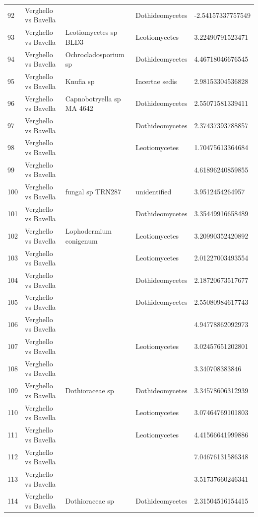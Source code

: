\documentclass[12pt]{article}\usepackage[]{graphicx}\usepackage[]{color}
\numberwithin{figure}{section}
\begin{document}
\begin{table}[ht]
\begin{tabular}{lllll}
  92 & Verghello vs Bavella &  & Dothideomycetes & -2.54157337757549 \\ 
  93 & Verghello vs Bavella & Leotiomycetes sp BLD3 & Leotiomycetes & 3.22490791523471 \\ 
  94 & Verghello vs Bavella & Ochrocladosporium sp & Dothideomycetes & 4.46718046676545 \\ 
  95 & Verghello vs Bavella & Knufia sp & Incertae sedis & 2.98153304536828 \\ 
  96 & Verghello vs Bavella & Capnobotryella sp MA 4642 & Dothideomycetes & 2.55071581339411 \\ 
  97 & Verghello vs Bavella &  & Dothideomycetes & 2.37437393788857 \\ 
  98 & Verghello vs Bavella &  & Leotiomycetes & 1.70475613364684 \\ 
  99 & Verghello vs Bavella &  &  & 4.61896240859855 \\ 
  100 & Verghello vs Bavella & fungal sp TRN287 & unidentified & 3.9512454264957 \\ 
  101 & Verghello vs Bavella &  & Dothideomycetes & 3.35449916658489 \\ 
  102 & Verghello vs Bavella & Lophodermium conigenum & Leotiomycetes & 3.20990352420892 \\ 
  103 & Verghello vs Bavella &  & Leotiomycetes & 2.01227003493554 \\ 
  104 & Verghello vs Bavella &  & Dothideomycetes & 2.18720673517677 \\ 
  105 & Verghello vs Bavella &  & Dothideomycetes & 2.55080984617743 \\ 
  106 & Verghello vs Bavella &  &  & 4.94778862092973 \\ 
  107 & Verghello vs Bavella &  & Leotiomycetes & 3.02457651202801 \\ 
  108 & Verghello vs Bavella &  &  & 3.340708383846 \\ 
  109 & Verghello vs Bavella & Dothioraceae sp & Dothideomycetes & 3.34578606312939 \\ 
  110 & Verghello vs Bavella &  & Leotiomycetes & 3.07464769101803 \\ 
  111 & Verghello vs Bavella &  & Leotiomycetes & 4.41566641999886 \\ 
  112 & Verghello vs Bavella &  &  & 7.04676131586348 \\ 
  113 & Verghello vs Bavella &  &  & 3.51737660246341 \\ 
  114 & Verghello vs Bavella & Dothioraceae sp & Dothideomycetes & 2.31504516154415 \\ 

\end{tabular}
\end{table}
\end{document}
